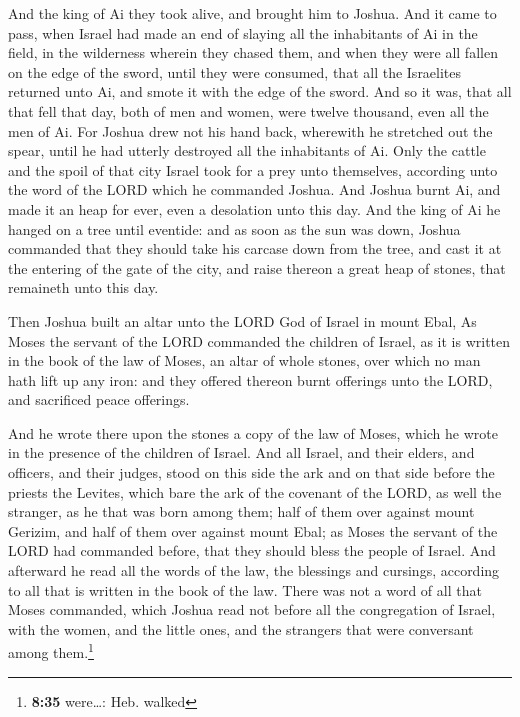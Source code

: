  And the king of Ai they took alive, and brought him to
Joshua.  And it came to pass, when Israel had made an end
of slaying all the inhabitants of Ai in the field, in the wilderness
wherein they chased them, and when they were all fallen on the edge of
the sword, until they were consumed, that all the Israelites returned
unto Ai, and smote it with the edge of the sword.  And so
it was, that all that fell that day, both of men and women, were twelve
thousand, even all the men of Ai.  For Joshua drew not
his hand back, wherewith he stretched out the spear, until he had
utterly destroyed all the inhabitants of Ai.  Only the
cattle and the spoil of that city Israel took for a prey unto
themselves, according unto the word of the LORD which he commanded
Joshua.  And Joshua burnt Ai, and made it an heap for
ever, even a desolation unto this day.  And the king of
Ai he hanged on a tree until eventide: and as soon as the sun was down,
Joshua commanded that they should take his carcase down from the tree,
and cast it at the entering of the gate of the city, and raise thereon a
great heap of stones, that remaineth unto this day.

 Then Joshua built an altar unto the LORD God of Israel
in mount Ebal,  As Moses the servant of the LORD
commanded the children of Israel, as it is written in the book of the
law of Moses, an altar of whole stones, over which no man hath lift up
any iron: and they offered thereon burnt offerings unto the LORD, and
sacrificed peace offerings.

 And he wrote there upon the stones a copy of the law of
Moses, which he wrote in the presence of the children of Israel.
 And all Israel, and their elders, and officers, and
their judges, stood on this side the ark and on that side before the
priests the Levites, which bare the ark of the covenant of the LORD, as
well the stranger, as he that was born among them; half of them over
against mount Gerizim, and half of them over against mount Ebal; as
Moses the servant of the LORD had commanded before, that they should
bless the people of Israel.  And afterward he read all
the words of the law, the blessings and cursings, according to all that
is written in the book of the law.  There was not a word
of all that Moses commanded, which Joshua read not before all the
congregation of Israel, with the women, and the little ones, and the
strangers that were conversant among them.\footnote{\textbf{8:35}
  were\ldots: Heb. walked}


